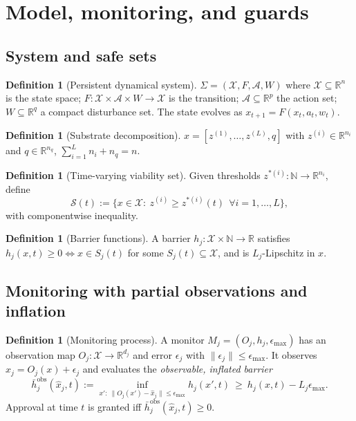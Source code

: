 \documentclass[11pt]{article}
\theoremstyle{definition}
\newtheorem{definition}[theorem]{Definition}
\newcommand{\X}{\mathcal{X}}
\newcommand{\A}{\mathcal{A}}
\newcommand{\Sset}{\mathcal{S}}
\newcommand{\Rset}{\mathbb{R}}
\newcommand{\1}{\mathbf{1}}
\begin{document}
\section{Model, monitoring, and guards}

\subsection{System and safe sets}
\begin{definition}[Persistent dynamical system]
\label{def:system}
$\Sigma=(\X,F,\A,W)$ where $\X\subseteq\Rset^n$ is the state space; $F:\X\times \A\times W\to \X$ is the transition; $\A\subseteq\Rset^p$ the action set; $W\subseteq\Rset^q$ a compact disturbance set. The state evolves as $x_{t+1}=F(x_t,a_t,w_t)$.
\end{definition}

\begin{definition}[Substrate decomposition]
\label{def:substrate}
$x=[z^{(1)},\dots,z^{(L)},q]$ with $z^{(i)}\in\Rset^{n_i}$ and $q\in\Rset^{n_q}$, $\sum_{i=1}^L n_i+n_q=n$.
\end{definition}

\begin{definition}[Time-varying viability set]
\label{def:viability}
Given thresholds $z^{*(i)}:\mathbb N\to\Rset^{n_i}$, define
\[
\Sset(t):=\{x\in\X:\ z^{(i)}\ge z^{*(i)}(t)\ \ \forall i=1,\dots,L\},
\]
with componentwise inequality.
\end{definition}

\begin{definition}[Barrier functions]
\label{def:barrier}
A barrier $h_j:\X\times\mathbb N\to\Rset$ satisfies $h_j(x,t)\ge 0 \iff x\in S_j(t)$ for some $S_j(t)\subseteq\X$, and is $L_j$-Lipschitz in $x$.
\end{definition}

\subsection{Monitoring with partial observations and inflation}
\begin{definition}[Monitoring process]
A monitor $M_j=(O_j,h_j,\epsilon_{\max})$ has an observation map $O_j:\X\to\Rset^{d_j}$ and error $\epsilon_j$ with $\|\epsilon_j\|\le \epsilon_{\max}$. It observes $\hat x_j=O_j(x)+\epsilon_j$ and evaluates the \emph{observable, inflated barrier}
\[
\bar h^{\mathrm{obs}}_j(\hat x_j,t):=\inf_{x':\ \|O_j(x')-\hat x_j\|\le \epsilon_{\max}} h_j(x',t)\ \ge\ h_j(x,t)-L_j\epsilon_{\max}.
\]
Approval at time $t$ is granted iff $\bar h^{\mathrm{obs}}_j(\hat x_j,t)\ge 0$.
\end{definition}
\end{document}
